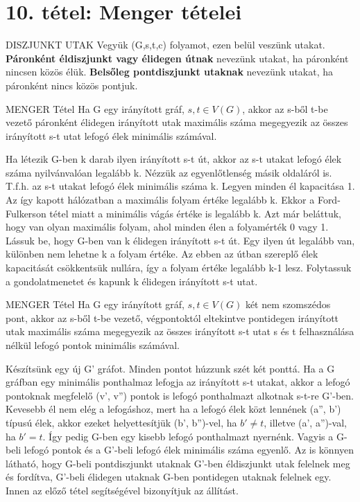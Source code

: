 \section{10. tétel: Menger tételei}

\begin{definicio}{DISZJUNKT UTAK}
Vegyük (G,s,t,c) folyamot, ezen belül veszünk utakat. \textbf{Páronként éldiszjunkt vagy élidegen útnak} nevezünk utakat, ha páronként nincsen közös élük. \textbf{Belsőleg pontdiszjunkt utaknak} nevezünk utakat, ha páronként nincs közös pontjuk.
\end{definicio}

\begin{tetel}{MENGER Tétel}
Ha G egy irányított gráf, $s,t\in V(G)$, akkor az s-ből t-be vezető páronként élidegen irányított utak maximális száma megegyezik az összes irányított s-t utat lefogó élek minimális számával.
\end{tetel}

\begin{bizonyitas}{}
Ha létezik G-ben k darab ilyen irányított s-t út, akkor az s-t utakat lefogó élek száma nyilvánvalóan legalább k. Nézzük az egyenlőtlenség másik oldaláról is. T.f.h. az s-t utakat lefogó élek minimális száma k. Legyen minden él kapacitása 1. Az így kapott hálózatban a maximális folyam értéke legalább k. Ekkor a Ford-Fulkerson tétel miatt a minimális vágás értéke is legalább k. Azt már beláttuk, hogy van olyan maximális folyam, ahol minden élen a folyamérték 0 vagy 1. Lássuk be, hogy G-ben van k élidegen irányított s-t út. Egy ilyen út legalább van, különben nem lehetne k a folyam értéke. Az ebben az útban szereplő élek kapacitását csökkentsük nullára, így a folyam értéke legalább k-1 lesz. Folytassuk a gondolatmenetet és kapunk k élidegen irányított s-t utat.
\end{bizonyitas}

\begin{tetel}{MENGER Tétel}
Ha G egy irányított gráf, $s,t\in V(G)$ két nem szomszédos pont, akkor az s-ből t-be vezető, végpontoktól eltekintve pontidegen irányított utak maximális száma megegyezik az összes irányított s-t utat s és t felhasználása nélkül lefogó pontok minimális számával.
\end{tetel}

\begin{bizonyitas}{}
Készítsünk egy új G' gráfot. Minden pontot húzzunk szét két ponttá. Ha a G gráfban egy minimális ponthalmaz lefogja az irányított s-t utakat, akkor a lefogó pontoknak megfelelő (v', v'') pontok is lefogó ponthalmazt alkotnak s-t-re G'-ben. Kevesebb él nem elég a lefogáshoz, mert ha a lefogó élek közt lennének (a'', b') típusú élek, akkor ezeket helyettesítjük (b', b'')-vel, ha $b' \neq t$, illetve (a', a'')-val, ha $b' = t$. Így pedig G-ben egy kisebb lefogó ponthalmazt nyernénk. Vagyis a G-beli lefogó pontok és a G'-beli lefogó élek minimális száma egyenlő. Az is könnyen látható, hogy G-beli pontdiszjunkt utaknak G'-ben éldiszjunkt utak felelnek meg és fordítva, G'-beli élidegen utaknak G-ben pontidegen utaknak felelnek egy. Innen az előző tétel segítségével bizonyítjuk az állítást.
\end{bizonyitas}

